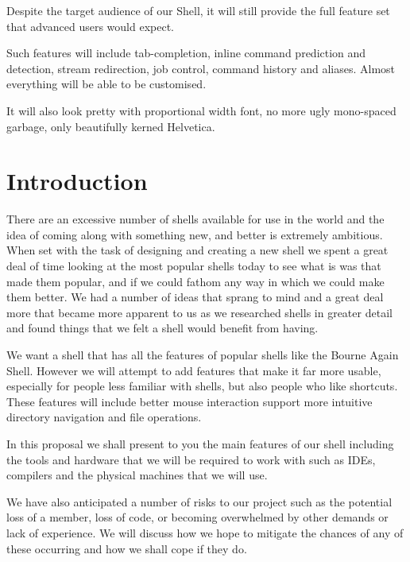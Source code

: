 \documentclass[a4paper,12pt]{article}
\begin{document}
\begin{titlepage}
{    Despite the target audience of our Shell, it will still provide the full feature set that advanced users would expect.

    Such features will include tab-completion, inline command prediction and detection, stream redirection, job control,  command history and aliases. Almost everything will be able to be customised.

    It will also look pretty with proportional width font, no more ugly mono-spaced garbage, only beautifully kerned Helvetica.}
\end{titlepage}




\section*{Introduction}
There are an excessive number of shells available for use in the world and the idea of coming along with something new, and better is extremely ambitious. When set with the task of designing and creating a new shell we spent a great deal of time looking at the most popular shells today to see what is was that made them popular, and if we could fathom any way in which we could make them better. We had a number of ideas that sprang to mind and a great deal more that became more apparent to us as we researched shells in greater detail and found things that we felt a shell would benefit from having.

We want a shell that has all the features of popular shells like the Bourne Again Shell. However we will attempt to add features that make it far more usable, especially for people less familiar with shells, but also people who like shortcuts. These features will include better mouse interaction support more intuitive directory navigation and file operations. 

In this proposal we shall present to you the main features of our shell including the tools and hardware that we will be required to work with such as IDEs, compilers and the physical machines that we will use.


We have also anticipated a number of risks to our project such as the potential loss of a member, loss of code, or becoming overwhelmed by other demands or lack of experience. We will discuss how we hope to mitigate the chances of any of these occurring and how we shall cope if they do. 
\end{document}
